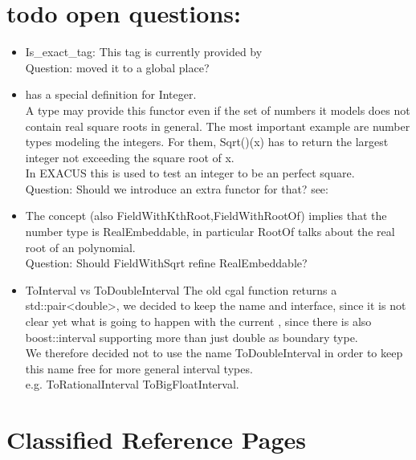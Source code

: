 


\section{todo open questions:}

\begin{itemize} 
\item Is\_exact\_tag: This tag is currently provided by \\
Question: moved it to a global place? 
\item {} has a special definition for Integer. \\
        A type may provide this functor even if the set of 
        numbers it models does not contain real square roots in general. 
        The most important example are number types modeling the integers. 
        For them, Sqrt()(x) has to return the largest integer not exceeding 
        the square root of x.\\
        In EXACUS this is used to test an integer to be an perfect square. \\
        Question: Should we introduce an extra functor for that?
        see: 
\item The concept  (also FieldWithKthRoot,FieldWithRootOf) 
      implies that the number type is RealEmbeddable, in particular RootOf talks 
      about the real root of an polynomial.\\
      Question: Should FieldWithSqrt refine RealEmbeddable?  
\item ToInterval vs ToDoubleInterval The old cgal function 
       returns a
      std::pair<double>, we decided to keep the name and interface, since it is not 
      clear yet what is going to happen with the current , 
      since there is also boost::interval supporting more than just double as 
      boundary type.\\
      We therefore decided not to use the name ToDoubleInterval in order to keep 
      this name free for more general interval types. \\
      e.g. ToRationalInterval ToBigFloatInterval. 
\end{itemize}

\section{Classified Reference Pages}

